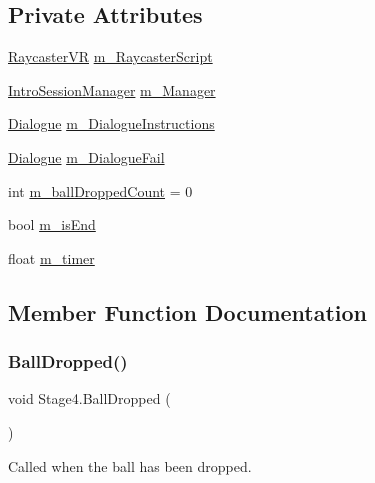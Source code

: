 \subsection*{Private Attributes}
\begin{DoxyCompactItemize}
\item 
\mbox{\hyperlink{class_v_r_standard_assets_1_1_utils_1_1_raycaster_v_r}{Raycaster\+VR}} \mbox{\hyperlink{class_stage4_a7ac8343ac248e658b20a135aa7771cf1}{m\+\_\+\+Raycaster\+Script}}
\item 
\mbox{\hyperlink{class_intro_session_manager}{Intro\+Session\+Manager}} \mbox{\hyperlink{class_stage4_a8f131659124d1b84a702b7a2b2b5b5ad}{m\+\_\+\+Manager}}
\item 
\mbox{\hyperlink{class_dialogue}{Dialogue}} \mbox{\hyperlink{class_stage4_a8862f5c33367530940185e68a778bb4a}{m\+\_\+\+Dialogue\+Instructions}}
\item 
\mbox{\hyperlink{class_dialogue}{Dialogue}} \mbox{\hyperlink{class_stage4_aae05efed193bd950fd9bf3c8b6d9e438}{m\+\_\+\+Dialogue\+Fail}}
\item 
int \mbox{\hyperlink{class_stage4_abca0599ad45f84b0cfa068aee6e10fa2}{m\+\_\+ball\+Dropped\+Count}} = 0
\item 
bool \mbox{\hyperlink{class_stage4_ae0bebd4e94c3f743c7e81af16042fe6d}{m\+\_\+is\+End}}
\item 
float \mbox{\hyperlink{class_stage4_a49602aa6588e4e288a1fda3ea03987a7}{m\+\_\+timer}}
\end{DoxyCompactItemize}


\subsection{Member Function Documentation}
\mbox{\label{class_stage4_a32fad5731207055e6b5630a59076dcfd}} 
\subsubsection{\texorpdfstring{Ball\+Dropped()}{BallDropped()}}
{\footnotesize\ttfamily void Stage4.\+Ball\+Dropped (\begin{DoxyParamCaption}{ }\end{DoxyParamCaption})\hspace{0.3cm}{\ttfamily [private]}}



Called when the ball has been dropped. 

